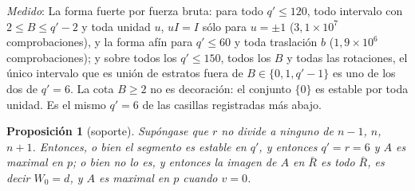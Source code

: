 \documentclass[11pt,a4paper]{article}
\newtheorem{proposition}[theorem]{Proposici\'on}
\theoremstyle{definition}
\newcommand{\medido}[1]{\emph{Medido}: #1}
\begin{document}
\medido{La forma fuerte por fuerza bruta: para todo $q'\le120$, todo intervalo con
$2\le B\le q'-2$ y toda unidad $u$, $uI=I$ s\'olo para $u=\pm1$ ($3{,}1\times10^7$ comprobaciones),
y la forma af\'in para $q'\le60$ y toda traslaci\'on $b$ ($1{,}9\times10^6$ comprobaciones); y sobre
todos los $q'\le150$, todos los $B$ y todas las rotaciones, el \'unico intervalo que es
uni\'on de estratos fuera de $B\in\{0,1,q'-1\}$ es uno de los dos de $q'=6$. La cota $B\ge2$ no es
decoraci\'on: el conjunto $\{0\}$ es estable por toda unidad. Es el mismo $q'=6$ de las casillas
registradas m\'as abajo.}

\begin{proposition}[soporte]\label{prop:sop}
Sup\'ongase que $r$ no divide a ninguno de $n-1$, $n$, $n+1$. Entonces, o bien el segmento es
estable en $q'$, y entonces $q'=r=6$ y $A$ es maximal en $p$; o bien no lo es, y entonces la imagen
de $A$ en $\bar R$ es todo $\bar R$, es decir $W_0=d$, y $A$ es maximal en $p$ cuando $v=0$.
\end{proposition}
\end{document}
